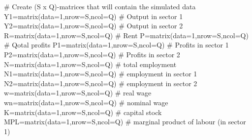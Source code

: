 \documentclass[
  letterpaper,
  DIV=11,
  numbers=noendperiod]{scrreprt}
\newenvironment{Shaded}{\begin{snugshade}}{\end{snugshade}}
\newcommand{\AttributeTok}[1]{\textcolor[rgb]{0.40,0.45,0.13}{#1}}
\newcommand{\CommentTok}[1]{\textcolor[rgb]{0.37,0.37,0.37}{#1}}
\newcommand{\DecValTok}[1]{\textcolor[rgb]{0.68,0.00,0.00}{#1}}
\newcommand{\FunctionTok}[1]{\textcolor[rgb]{0.28,0.35,0.67}{#1}}
\newcommand{\NormalTok}[1]{\textcolor[rgb]{0.00,0.23,0.31}{#1}}
\newcommand{\OtherTok}[1]{\textcolor[rgb]{0.00,0.23,0.31}{#1}}
\begin{document}
\begin{Shaded}
\begin{Highlighting}[]
\CommentTok{\# Create (S x Q){-}matrices that will contain the simulated data}
\NormalTok{Y1}\OtherTok{=}\FunctionTok{matrix}\NormalTok{(}\AttributeTok{data=}\DecValTok{1}\NormalTok{,}\AttributeTok{nrow=}\NormalTok{S,}\AttributeTok{ncol=}\NormalTok{Q) }\CommentTok{\# Output in sector 1}
\NormalTok{Y2}\OtherTok{=}\FunctionTok{matrix}\NormalTok{(}\AttributeTok{data=}\DecValTok{1}\NormalTok{,}\AttributeTok{nrow=}\NormalTok{S,}\AttributeTok{ncol=}\NormalTok{Q) }\CommentTok{\# Output in sector 2}
\NormalTok{R}\OtherTok{=}\FunctionTok{matrix}\NormalTok{(}\AttributeTok{data=}\DecValTok{1}\NormalTok{,}\AttributeTok{nrow=}\NormalTok{S,}\AttributeTok{ncol=}\NormalTok{Q) }\CommentTok{\# Rent}
\NormalTok{P}\OtherTok{=}\FunctionTok{matrix}\NormalTok{(}\AttributeTok{data=}\DecValTok{1}\NormalTok{,}\AttributeTok{nrow=}\NormalTok{S,}\AttributeTok{ncol=}\NormalTok{Q) }\CommentTok{\# Qotal profits}
\NormalTok{P1}\OtherTok{=}\FunctionTok{matrix}\NormalTok{(}\AttributeTok{data=}\DecValTok{1}\NormalTok{,}\AttributeTok{nrow=}\NormalTok{S,}\AttributeTok{ncol=}\NormalTok{Q) }\CommentTok{\# Profits in sector 1}
\NormalTok{P2}\OtherTok{=}\FunctionTok{matrix}\NormalTok{(}\AttributeTok{data=}\DecValTok{1}\NormalTok{,}\AttributeTok{nrow=}\NormalTok{S,}\AttributeTok{ncol=}\NormalTok{Q) }\CommentTok{\# Profits in sector 2}
\NormalTok{N}\OtherTok{=}\FunctionTok{matrix}\NormalTok{(}\AttributeTok{data=}\DecValTok{1}\NormalTok{,}\AttributeTok{nrow=}\NormalTok{S,}\AttributeTok{ncol=}\NormalTok{Q) }\CommentTok{\# total employment}
\NormalTok{N1}\OtherTok{=}\FunctionTok{matrix}\NormalTok{(}\AttributeTok{data=}\DecValTok{1}\NormalTok{,}\AttributeTok{nrow=}\NormalTok{S,}\AttributeTok{ncol=}\NormalTok{Q) }\CommentTok{\# employment in sector 1}
\NormalTok{N2}\OtherTok{=}\FunctionTok{matrix}\NormalTok{(}\AttributeTok{data=}\DecValTok{1}\NormalTok{,}\AttributeTok{nrow=}\NormalTok{S,}\AttributeTok{ncol=}\NormalTok{Q) }\CommentTok{\# employment in sector 2}
\NormalTok{w}\OtherTok{=}\FunctionTok{matrix}\NormalTok{(}\AttributeTok{data=}\DecValTok{1}\NormalTok{,}\AttributeTok{nrow=}\NormalTok{S,}\AttributeTok{ncol=}\NormalTok{Q) }\CommentTok{\# real wage}
\NormalTok{wn}\OtherTok{=}\FunctionTok{matrix}\NormalTok{(}\AttributeTok{data=}\DecValTok{1}\NormalTok{,}\AttributeTok{nrow=}\NormalTok{S,}\AttributeTok{ncol=}\NormalTok{Q) }\CommentTok{\# nominal wage}
\NormalTok{K}\OtherTok{=}\FunctionTok{matrix}\NormalTok{(}\AttributeTok{data=}\DecValTok{1}\NormalTok{,}\AttributeTok{nrow=}\NormalTok{S,}\AttributeTok{ncol=}\NormalTok{Q) }\CommentTok{\# capital stock}
\NormalTok{MPL}\OtherTok{=}\FunctionTok{matrix}\NormalTok{(}\AttributeTok{data=}\DecValTok{1}\NormalTok{,}\AttributeTok{nrow=}\NormalTok{S,}\AttributeTok{ncol=}\NormalTok{Q) }\CommentTok{\# marginal product of labour (in sector 1)}

\end{Highlighting}
\end{Shaded}
\end{document}
